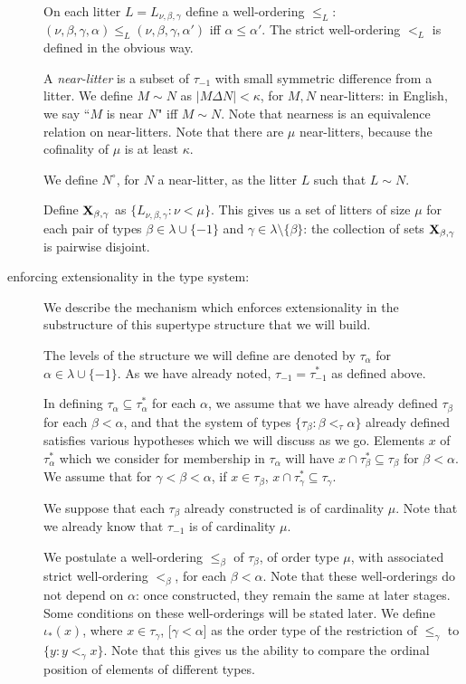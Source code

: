 \documentclass[112pt]{article}
\begin{document}
\begin{description}
On each litter $L =  L_{\nu,\beta,\gamma}$ define a well-ordering $\leq_L$:  $(\nu,\beta,\gamma,\alpha) \leq_L (\nu,\beta,\gamma,\alpha')$  iff $\alpha\leq \alpha'$.
The strict well-ordering $<_L$ is defined in the obvious way.

A {\em near-litter\/} is a subset of $\tau_{-1}$ with small symmetric difference from a litter.  We define $M \sim N$ as $|M \Delta N|<\kappa$, for $M,N$ near-litters:  in English, we say ``$M$ is near $N$" iff $M \sim N$.  Note that nearness is an equivalence relation on near-litters.  Note that there are $\mu$ near-litters, because the cofinality of $\mu$ is at least $\kappa$.

We define $N^\circ$, for $N$ a near-litter, as the litter $L$ such that $L \sim N$.  

Define ${\bf X}_{\beta,\gamma}$ as $\{L_{\nu,\beta,\gamma}:\nu < \mu\}$.  This gives us a set of litters of size $\mu$ for each pair of
types $\beta\in \lambda \cup \{-1\}$ and $\gamma \in \lambda \setminus \{\beta\}$:  the collection of sets ${\bf X}_{\beta,\gamma}$ is pairwise disjoint.  

\item[enforcing extensionality in the type system:]  We describe the mechanism which enforces extensionality in the substructure of this supertype structure that we will build.

The levels of the structure we will define are denoted by $\tau_\alpha$ for $\alpha \in \lambda \cup \{-1\}$.  As we have already noted, $\tau_{-1}=\tau^*_{-1}$ as defined above.

In defining $\tau_\alpha \subseteq \tau^*_\alpha$ for each $\alpha$, we assume that we have already defined $\tau_\beta$ for each $\beta<\alpha$, and that the system of types $\{\tau_\beta:\beta <_\tau \alpha\}$ already defined satisfies various hypotheses which we will discuss as we go.
Elements $x$ of $\tau^*_\alpha$ which we consider for membership in $\tau_\alpha$ will have $x \cap \tau^*_\beta \subseteq \tau_\beta$ for $\beta<\alpha$.  We assume that for $\gamma<\beta<\alpha$, if $x \in \tau_\beta$, $x \cap \tau^*_\gamma \subseteq \tau_\gamma$.

We suppose that each $\tau_\beta$ already constructed is of cardinality $\mu$.  Note that we already know that
$\tau_{-1}$ is of cardinality $\mu$.

We postulate a well-ordering $\leq_\beta$ of $\tau_\beta$, of order type $\mu$, with associated strict well-ordering $<_\beta$, for each $\beta<\alpha$.   Note that these well-orderings do not depend on $\alpha$:  once constructed, they remain the same at later stages.  Some conditions on these well-orderings will be stated later.  We define $\iota_*(x)$, where $x \in \tau_\gamma$, $[\gamma <\alpha$] as the order type of the restriction of $\leq_\gamma$ to
$\{y:y <_\gamma x\}$.  Note that this gives us the ability to compare the ordinal position of elements of different types.


\end{description}
\end{document}
